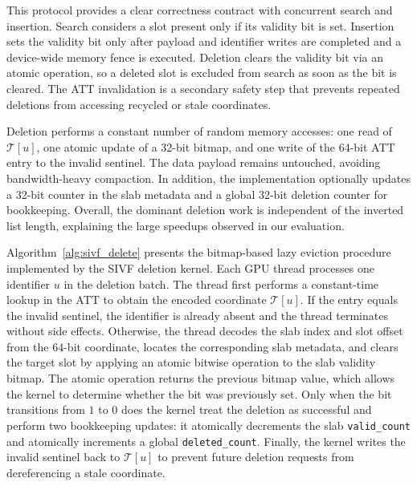 \documentclass[sigconf,nonacm]{acmart}
\theoremstyle{plain}
\theoremstyle{definition}
\theoremstyle{remark}
\begin{document}
This protocol provides a clear correctness contract with concurrent search and insertion. Search considers a slot present only if its validity bit is set. Insertion sets the validity bit only after payload and identifier writes are completed and a device-wide memory fence is executed. Deletion clears the validity bit via an atomic operation, so a deleted slot is excluded from search as soon as the bit is cleared. The ATT invalidation is a secondary safety step that prevents repeated deletions from accessing recycled or stale coordinates.

Deletion performs a constant number of random memory accesses: one read of $\mathcal{T}[u]$, one atomic update of a 32-bit bitmap, and one write of the 64-bit ATT entry to the invalid sentinel. The data payload remains untouched, avoiding bandwidth-heavy compaction. In addition, the implementation optionally updates a 32-bit counter in the slab metadata and a global 32-bit deletion counter for bookkeeping. Overall, the dominant deletion work is independent of the inverted list length, explaining the large speedups observed in our evaluation.

Algorithm~\ref{alg:sivf_delete} presents the bitmap-based lazy eviction procedure implemented by the SIVF deletion kernel. 
Each GPU thread processes one identifier $u$ in the deletion batch. 
The thread first performs a constant-time lookup in the ATT to obtain the encoded coordinate $\mathcal{T}[u]$. 
If the entry equals the invalid sentinel, the identifier is already absent and the thread terminates without side effects. 
Otherwise, the thread decodes the slab index and slot offset from the 64-bit coordinate, locates the corresponding slab metadata, and clears the target slot by applying an atomic bitwise operation to the slab validity bitmap. 
The atomic operation returns the previous bitmap value, which allows the kernel to determine whether the bit was previously set. 
Only when the bit transitions from $1$ to $0$ does the kernel treat the deletion as successful and perform two bookkeeping updates: it atomically decrements the slab \texttt{valid\_count} and atomically increments a global \texttt{deleted\_count}. 
Finally, the kernel writes the invalid sentinel back to $\mathcal{T}[u]$ to prevent future deletion requests from dereferencing a stale coordinate. 
\end{document}
